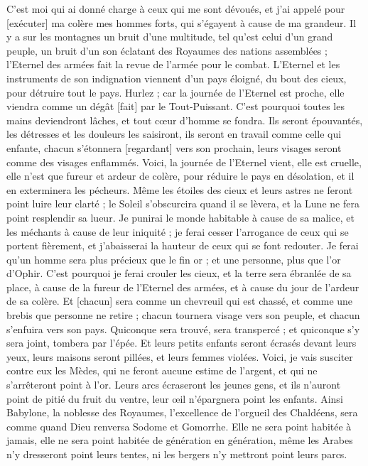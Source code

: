 \begin{multicols}{2}
C'est moi qui ai donné charge à ceux qui me sont dévoués, et j'ai appelé pour [exécuter] ma colère mes hommes forts, qui s'égayent à cause de ma grandeur.
Il y a sur les montagnes un bruit d'une multitude, tel qu'est celui d'un grand peuple, un bruit d'un son éclatant des Royaumes des nations assemblées ; l'Eternel des armées fait la revue de l'armée pour le combat.
L'Eternel et les instruments de son indignation viennent d'un pays éloigné, du bout des cieux, pour détruire tout le pays.
Hurlez ; car la journée de l'Eternel est proche, elle viendra comme un dégât [fait] par le Tout-Puissant.
C'est pourquoi toutes les mains deviendront lâches, et tout cœur d'homme se fondra.
Ils seront épouvantés, les détresses et les douleurs les saisiront, ils seront en travail comme celle qui enfante, chacun s'étonnera [regardant] vers son prochain, leurs visages seront comme des visages enflammés.
Voici, la journée de l'Eternel vient, elle est cruelle, elle n'est que fureur et ardeur de colère, pour réduire le pays en désolation, et il en exterminera les pécheurs.
Même les étoiles des cieux et leurs astres ne feront point luire leur clarté ; le Soleil s'obscurcira quand il se lèvera, et la Lune ne fera point resplendir sa lueur.
Je punirai le monde habitable à cause de sa malice, et les méchants à cause de leur iniquité ; je ferai cesser l'arrogance de ceux qui se portent fièrement, et j'abaisserai la hauteur de ceux qui se font redouter.
Je ferai qu'un homme sera plus précieux que le fin or ; et une personne, plus que l'or d'Ophir.
C'est pourquoi je ferai crouler les cieux, et la terre sera ébranlée de sa place, à cause de la fureur de l'Eternel des armées, et à cause du jour de l'ardeur de sa colère.
Et [chacun] sera comme un chevreuil qui est chassé, et comme une brebis que personne ne retire ; chacun tournera visage vers son peuple, et chacun s'enfuira vers son pays.
Quiconque sera trouvé, sera transpercé ; et quiconque s'y sera joint, tombera par l'épée.
Et leurs petits enfants seront écrasés devant leurs yeux, leurs maisons seront pillées, et leurs femmes violées.
Voici, je vais susciter contre eux les Mèdes, qui ne feront aucune estime de l'argent, et qui ne s'arrêteront point à l'or.
Leurs arcs écraseront les jeunes gens, et ils n'auront point de pitié du fruit du ventre, leur œil n'épargnera point les enfants.
Ainsi Babylone, la noblesse des Royaumes, l'excellence de l'orgueil des Chaldéens, sera comme quand Dieu renversa Sodome et Gomorrhe.
Elle ne sera point habitée à jamais, elle ne sera point habitée de génération en génération, même les Arabes n'y dresseront point leurs tentes, ni les bergers n'y mettront point leurs parcs.

\end{multicols}
